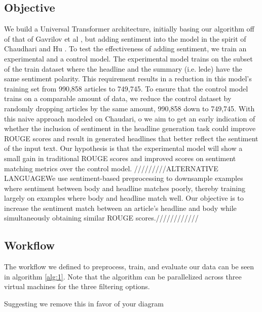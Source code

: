 \documentclass[11pt]{article}
\begin{document}
\subsection{Objective}
We build a Universal Transformer architecture, initially basing our algorithm off of that of Gavrilov et al \cite{DBLP:journals/corr/abs-1901-07786}, but adding sentiment into the model in the spirit of Chaudhari \cite{DBLP:journals/corr/abs-1802-09426} and Hu \cite{DBLP:journals/corr/HuYLSX17}. To test the effectiveness of adding sentiment, we train an experimental and a control model.
The experimental model trains on the subset of the train dataset where the headline and the summary (i.e. lede) have the same sentiment polarity. This requirement results in a reduction in this model's training set from 990,858 articles to 749,745. To ensure that the control model trains on a comparable amount of data, we reduce the control dataset by randomly dropping articles by the same amount, 990,858 down to 749,745. 
With this naive approach modeled on Chaudari\cite{DBLP:journals/corr/abs-1802-09426}, o
we aim to get an early indication of whether the inclusion of sentiment in the headline generation task could improve ROUGE scores and result in generated headlines that better reflect the sentiment of the input text. Our hypothesis is that the experimental model will show a small gain in traditional ROUGE scores and improved scores on sentiment matching metrics over the control model. 
/////////ALTERNATIVE LANGUAGEWe use sentiment-based preprocessing to downsample examples where sentiment between body and headline matches poorly, thereby training largely on examples where body and headline match well. Our objective is to increase the sentiment match between an article's headline and body while simultaneously obtaining similar ROUGE scores.////////////

\subsection{Workflow}

The workflow we defined to preprocess, train, and evaluate our data can be seen in algorithm \ref{alg:1}. Note that the algorithm can be parallelized across three virtual machines for the three filtering options.

Suggesting we remove this in favor of your diagram

\end{document}
